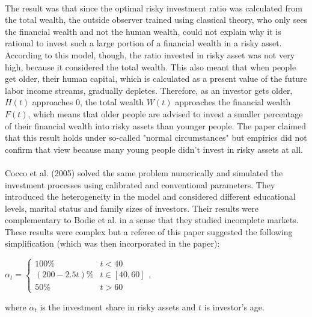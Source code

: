 \paragraph*{}The result was that since the optimal risky investment ratio was calculated from the total wealth, the outside observer trained using classical theory, who only sees the financial wealth and not the human wealth, could not explain why it is rational to invest such a large portion of a financial wealth in a risky asset. According to this model, though, the ratio invested in risky asset was not very high, because it considered the total wealth. This also meant that when people get older, their human capital, which is calculated as a present value of the future labor income streams, gradually depletes. Therefore, as an investor gets older, $H(t)$ approaches $0$, the total wealth $W(t)$ approaches the financial wealth $F(t)$, which means that older people are advised to invest a smaller percentage of their financial wealth into risky assets than younger people. The paper claimed that this result holds under so-called "normal circumstances" but empirics did not confirm that view because many young people didn't invest in risky assets at all. 

\paragraph*{}Cocco et al. (2005) solved the same problem numerically and simulated the investment processes using calibrated and conventional parameters. They introduced the heterogeneity in the model and considered different educational levels, marital status and family sizes of investors. Their results were complementary to Bodie et al. in a sense that they studied incomplete markets. These results were complex but a referee of this paper suggested the following simplification (which was then incorporated in the paper):

\begin{center}
	$\alpha_t = \begin{cases} 100\% & t<40\\(200-2.5t)\% & t\in[40,60]\\50\% & t>60 \end{cases}$,
\end{center}

where $\alpha_t$ is the investment share in risky assets and $t$ is investor's age.

